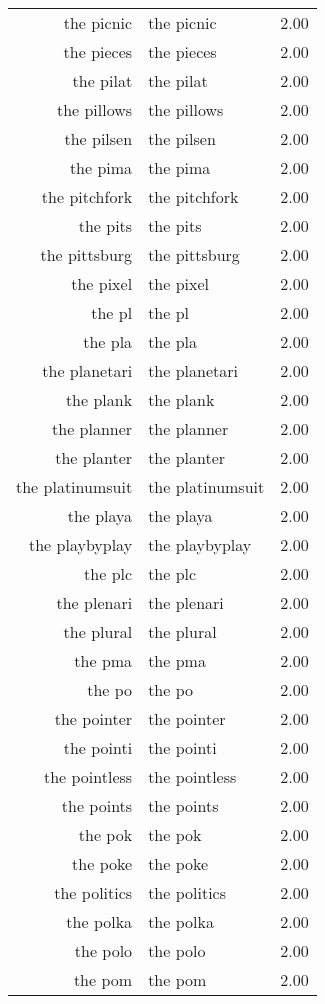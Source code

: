 \begin{table}[ht]
\begin{tabular}{rlr}
  the picnic & the picnic & 2.00 \\ 
  the pieces & the pieces & 2.00 \\ 
  the pilat & the pilat & 2.00 \\ 
  the pillows & the pillows & 2.00 \\ 
  the pilsen & the pilsen & 2.00 \\ 
  the pima & the pima & 2.00 \\ 
  the pitchfork & the pitchfork & 2.00 \\ 
  the pits & the pits & 2.00 \\ 
  the pittsburg & the pittsburg & 2.00 \\ 
  the pixel & the pixel & 2.00 \\ 
  the pl & the pl & 2.00 \\ 
  the pla & the pla & 2.00 \\ 
  the planetari & the planetari & 2.00 \\ 
  the plank & the plank & 2.00 \\ 
  the planner & the planner & 2.00 \\ 
  the planter & the planter & 2.00 \\ 
  the platinumsuit & the platinumsuit & 2.00 \\ 
  the playa & the playa & 2.00 \\ 
  the playbyplay & the playbyplay & 2.00 \\ 
  the plc & the plc & 2.00 \\ 
  the plenari & the plenari & 2.00 \\ 
  the plural & the plural & 2.00 \\ 
  the pma & the pma & 2.00 \\ 
  the po & the po & 2.00 \\ 
  the pointer & the pointer & 2.00 \\ 
  the pointi & the pointi & 2.00 \\ 
  the pointless & the pointless & 2.00 \\ 
  the points & the points & 2.00 \\ 
  the pok & the pok & 2.00 \\ 
  the poke & the poke & 2.00 \\ 
  the politics & the politics & 2.00 \\ 
  the polka & the polka & 2.00 \\ 
  the polo & the polo & 2.00 \\ 
  the pom & the pom & 2.00 \\ 

\end{tabular}
\end{table}
